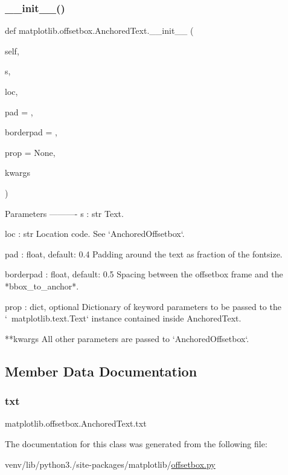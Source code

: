 \subsubsection{\texorpdfstring{\+\_\+\+\_\+init\+\_\+\+\_\+()}{\_\_init\_\_()}}
{\footnotesize\ttfamily def matplotlib.\+offsetbox.\+Anchored\+Text.\+\_\+\+\_\+init\+\_\+\+\_\+ (\begin{DoxyParamCaption}\item[{}]{self,  }\item[{}]{s,  }\item[{}]{loc,  }\item[{}]{pad = {},  }\item[{}]{borderpad = {},  }\item[{}]{prop = {\ttfamily None},  }\item[{}]{kwargs }\end{DoxyParamCaption})}

\begin{DoxyVerb}Parameters
----------
s : str
    Text.

loc : str
    Location code. See `AnchoredOffsetbox`.

pad : float, default: 0.4
    Padding around the text as fraction of the fontsize.

borderpad : float, default: 0.5
    Spacing between the offsetbox frame and the *bbox_to_anchor*.

prop : dict, optional
    Dictionary of keyword parameters to be passed to the
    `~matplotlib.text.Text` instance contained inside AnchoredText.

**kwargs
    All other parameters are passed to `AnchoredOffsetbox`.
\end{DoxyVerb}
 

\subsection{Member Data Documentation}
\mbox{\label{classmatplotlib_1_1offsetbox_1_1AnchoredText_ad0b6486a0cea0db2ee1abb3fd72d91b2}} 
\subsubsection{\texorpdfstring{txt}{txt}}
{\footnotesize\ttfamily matplotlib.\+offsetbox.\+Anchored\+Text.\+txt}



The documentation for this class was generated from the following file\+:\begin{DoxyCompactItemize}
\item 
venv/lib/python3./site-\/packages/matplotlib/\hyperlink{offsetbox_8py}{offsetbox.\+py}\end{DoxyCompactItemize}
